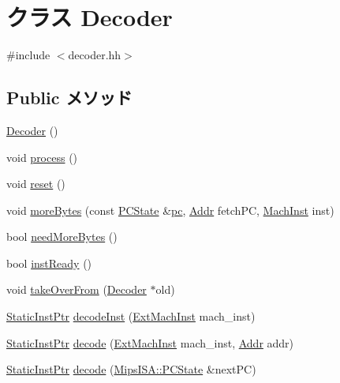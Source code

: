 \hypertarget{classMipsISA_1_1Decoder}{
\section{クラス Decoder}
\label{classMipsISA_1_1Decoder}
}


{\ttfamily \#include $<$decoder.hh$>$}\subsection*{Public メソッド}
\begin{DoxyCompactItemize}
\item 
\hyperlink{classMipsISA_1_1Decoder_aedfa2b7d97ed17b14903ed75d6214c78}{Decoder} ()
\item 
void \hyperlink{classMipsISA_1_1Decoder_a2e9c5136d19b1a95fc427e0852deab5c}{process} ()
\item 
void \hyperlink{classMipsISA_1_1Decoder_ad20897c5c8bd47f5d4005989bead0e55}{reset} ()
\item 
void \hyperlink{classMipsISA_1_1Decoder_a85a99c8dd9425508bee9a17836dbbd12}{moreBytes} (const \hyperlink{classGenericISA_1_1DelaySlotPCState}{PCState} \&\hyperlink{namespaceMipsISA_a70af401addf580de8d9ddd8af1165481}{pc}, \hyperlink{classm5_1_1params_1_1Addr}{Addr} fetchPC, \hyperlink{namespaceMipsISA_a301c22ea09fa33dcfe6ddf22f203699c}{MachInst} inst)
\item 
bool \hyperlink{classMipsISA_1_1Decoder_a35631c47fc45b69ca30e6551f9f5d1d1}{needMoreBytes} ()
\item 
bool \hyperlink{classMipsISA_1_1Decoder_a9f6a0bc8946ca58d5d59a5dbc6a3181f}{instReady} ()
\item 
void \hyperlink{classMipsISA_1_1Decoder_a83393f90e7cbd98eda9721ba6022d0e0}{takeOverFrom} (\hyperlink{classMipsISA_1_1Decoder}{Decoder} $\ast$old)
\item 
\hyperlink{classRefCountingPtr}{StaticInstPtr} \hyperlink{classMipsISA_1_1Decoder_a148768e0e9062eb41f604040d0ea86e6}{decodeInst} (\hyperlink{namespaceMipsISA_aec686c38e40c7f794f1435591c15c275}{ExtMachInst} mach\_\-inst)
\item 
\hyperlink{classRefCountingPtr}{StaticInstPtr} \hyperlink{classMipsISA_1_1Decoder_a4ed948f8d08575cc2916fe32154ea69d}{decode} (\hyperlink{namespaceMipsISA_aec686c38e40c7f794f1435591c15c275}{ExtMachInst} mach\_\-inst, \hyperlink{classm5_1_1params_1_1Addr}{Addr} addr)
\item 
\hyperlink{classRefCountingPtr}{StaticInstPtr} \hyperlink{classMipsISA_1_1Decoder_aafd5f445d783c8fe7f2ebbe211486a80}{decode} (\hyperlink{classGenericISA_1_1DelaySlotPCState}{MipsISA::PCState} \&nextPC)

\end{DoxyCompactItemize}
